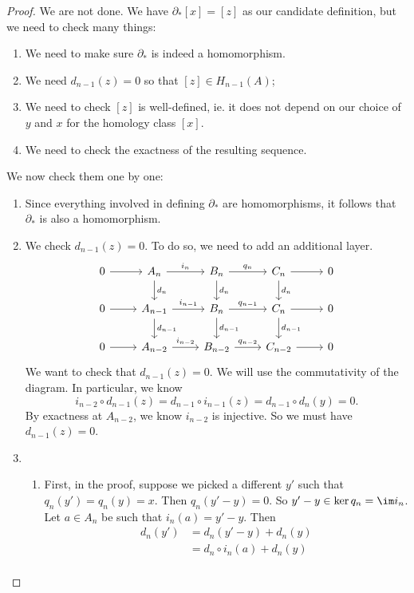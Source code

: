 \documentclass[a4paper]{article}
\theoremstyle{definition}
\begin{document}
\begin{proof}
  We are not done. We have $\partial_* [x] = [z]$ as our candidate definition, but we need to check many things:
  \begin{enumerate}
    \item We need to make sure $\partial_*$ is indeed a homomorphism.
    \item We need $d_{n - 1}(z) = 0$ so that $[z] \in H_{n - 1}(A)$;
    \item We need to check $[z]$ is well-defined, ie. it does not depend on our choice of $y$ and $x$ for the homology class $[x]$.
    \item We need to check the exactness of the resulting sequence.
  \end{enumerate}
  We now check them one by one:
  \begin{enumerate}
    \item Since everything involved in defining $\partial_*$ are homomorphisms, it follows that $\partial_*$ is also a homomorphism.
    \item We check $d_{n - 1}(z) = 0$. To do so, we need to add an additional layer.
      \[
        \begin{tikzcd}
          0 \ar[r] & A_n \ar[r, "i_n"] \ar[d, "d_n"] & B_n \ar[r, "q_n"] \ar[d, "d_n"] & C_n \ar[r] \ar[d, "d_n"] & 0\\
          0 \ar[r] & A_{n - 1} \ar[r, "i_{n - 1}"] \ar[d, "d_{n - 1}"] & B_n \ar[r, "q_{n - 1}"] \ar[d, "d_{n - 1}"] & C_n \ar[r] \ar[d, "d_{n - 1}"] & 0\\
          0 \ar[r] & A_{n - 2} \ar[r, "i_{n - 2}"] & B_{n - 2} \ar[r, "q_{n - 2}"] & C_{n - 2} \ar[r] & 0
        \end{tikzcd}
      \]
      We want to check that $d_{n - 1}(z) = 0$. We will use the commutativity of the diagram. In particular, we know
      \[
        i_{n - 2} \circ d_{n - 1}(z) = d_{n - 1} \circ i_{n - 1} (z) = d_{n - 1} \circ d_n(y) = 0.
      \]
      By exactness at $A_{n - 2}$, we know $i_{n - 2}$ is injective. So we must have $d_{n - 1}(z) = 0$.
    \item
      \begin{enumerate}
        \item First, in the proof, suppose we picked a different $y'$ such that $q_n(y') = q_n(y) = x$. Then $q_n(y' - y) = 0$. So $y' - y \in \ker q_n = \im i_n$. Let $a \in A_n$ be such that $i_n(a) = y' - y$. Then
          \begin{align*}
            d_n(y') &= d_n(y' - y) + d_n(y) \\
            &= d_n \circ i_n (a) + d_n(y) \\

\end{align*}
\end{enumerate}
\end{enumerate}
\end{proof}
\end{document}
